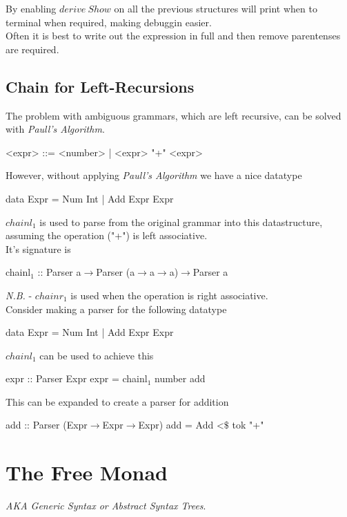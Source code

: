 \documentclass[11pt,a4paper]{article}
\begin{document}
By enabling $derive\ Show$ on all the previous structures will print when to terminal when required, making debuggin easier.\\

Often it is best to write out the expression in full and then remove parentenses are required.

\subsection{Chain for Left-Recursions}

The problem with ambiguous grammars, which are left recursive, can be solved with \textit{Paull's Algorithm}.
\begin{code}
<expr> ::= <number>
         | <expr> "+" <expr>
\end{code}
However, without applying \textit{Paull's Algorithm} we have a nice datatype
\begin{code}
data Expr = Num Int
          | Add Expr Expr
\end{code}

$chainl_1$ is used to parse from the original grammar into this datastructure, assuming the operation ("+") is left associative.\\
It's signature is
\begin{code}
chainl$_1$ :: Parser a$\to$Parser (a$\to$a$\to$a)$\to$Parser a
\end{code}
\textit{N.B.} - $chainr_1$ is used when the operation is right associative.\\

Consider making a parser for the following datatype
\begin{code}
data Expr = Num Int
          | Add Expr Expr
\end{code}
$chainl_1$ can be used to achieve this
\begin{code}
expr :: Parser Expr
expr = chainl$_1$ number add
\end{code}
This can be expanded to create a parser for addition
\begin{code}
add :: Parser (Expr$\to$Expr$\to$Expr)
add = Add <$\mathdollar$ tok "+"
\end{code}

\section{The Free Monad}
\textit{AKA Generic Syntax or Abstract Syntax Trees}.\\
\end{document}
